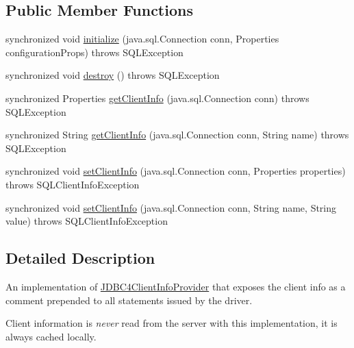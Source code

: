 \subsection*{Public Member Functions}
\begin{DoxyCompactItemize}
\item 
synchronized void \mbox{\hyperlink{classcom_1_1mysql_1_1jdbc_1_1_j_d_b_c4_comment_client_info_provider_a4bac1954180325c5961e2e5270be7ced}{initialize}} (java.\+sql.\+Connection conn, Properties configuration\+Props)  throws S\+Q\+L\+Exception 
\item 
synchronized void \mbox{\hyperlink{classcom_1_1mysql_1_1jdbc_1_1_j_d_b_c4_comment_client_info_provider_afd0b86441f8ca2b65dae7c265b69ecec}{destroy}} ()  throws S\+Q\+L\+Exception 
\item 
synchronized Properties \mbox{\hyperlink{classcom_1_1mysql_1_1jdbc_1_1_j_d_b_c4_comment_client_info_provider_a1b7fb984a52c404502cb78bc07673e3a}{get\+Client\+Info}} (java.\+sql.\+Connection conn)  throws S\+Q\+L\+Exception 
\item 
synchronized String \mbox{\hyperlink{classcom_1_1mysql_1_1jdbc_1_1_j_d_b_c4_comment_client_info_provider_ad85c93d4ed96cddff56207a7e315ba93}{get\+Client\+Info}} (java.\+sql.\+Connection conn, String name)  throws S\+Q\+L\+Exception 
\item 
synchronized void \mbox{\hyperlink{classcom_1_1mysql_1_1jdbc_1_1_j_d_b_c4_comment_client_info_provider_aa859dc068c85908783e59566c2ba32cf}{set\+Client\+Info}} (java.\+sql.\+Connection conn, Properties properties)  throws S\+Q\+L\+Client\+Info\+Exception 
\item 
synchronized void \mbox{\hyperlink{classcom_1_1mysql_1_1jdbc_1_1_j_d_b_c4_comment_client_info_provider_a00f16e37481cbadcf8b5d8e6267cd54a}{set\+Client\+Info}} (java.\+sql.\+Connection conn, String name, String value)  throws S\+Q\+L\+Client\+Info\+Exception 
\end{DoxyCompactItemize}


\subsection{Detailed Description}
An implementation of \mbox{\hyperlink{interfacecom_1_1mysql_1_1jdbc_1_1_j_d_b_c4_client_info_provider}{J\+D\+B\+C4\+Client\+Info\+Provider}} that exposes the client info as a comment prepended to all statements issued by the driver.

Client information is {\itshape never} read from the server with this implementation, it is always cached locally. 

